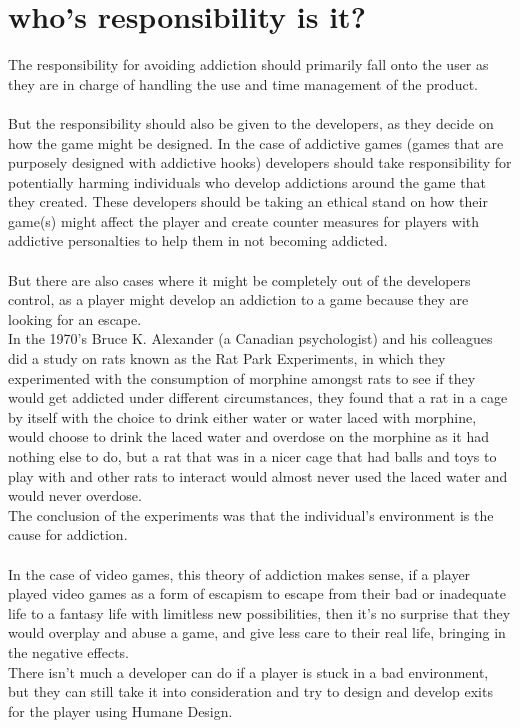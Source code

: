 \documentclass{scrartcl}
\begin{document}
\section{who's responsibility is it?}
The responsibility for avoiding addiction should primarily fall onto the user as they are in charge of handling the use and time management of the product.
\\
\\
But the responsibility should also be given to the developers, as they decide on how the game might be designed. In the case of addictive games (games that are purposely designed with addictive hooks) developers should take responsibility for potentially harming individuals who develop addictions around the game that they created. These developers should be taking an ethical stand on how their game(s) might affect the player and create counter measures for players with addictive personalties to help them in not becoming addicted.
\\
\\
But there are also cases where it might be completely out of the developers control, as a player might develop an addiction to a game because they are looking for an escape.
\\
In the 1970's Bruce K. Alexander (a Canadian psychologist) and his colleagues did a study on rats known as the Rat Park Experiments, in which they experimented with the consumption of morphine amongst rats to see if they would get addicted under different circumstances, they found that a rat in a cage by itself with the choice to drink either water or water laced with morphine, would choose to drink the laced water and overdose on the morphine as it had nothing else to do, but a rat that was in a nicer cage that had balls and toys to play with and other rats to interact would almost never used the laced water and would never overdose.\cite{RatPark1, RatPark2}
\\
The conclusion of the experiments was that the individual's environment is the cause for addiction.
\\
\\
In the case of video games, this theory of addiction makes sense, if a player played video games as a form of escapism to escape from their bad or inadequate life to a fantasy life with limitless new possibilities, then it's no surprise that they would overplay and abuse a game, and give less care to their real life, bringing in the negative effects.
\\
There isn't much a developer can do if a player is stuck in a bad environment, but they can still take it into consideration and try to design and develop exits for the player using Humane Design.\cite{ExitPoints}
\end{document}
